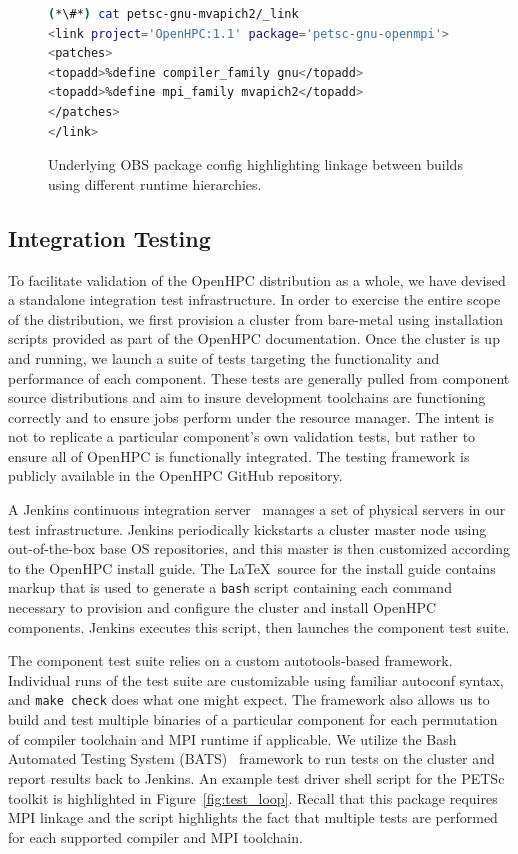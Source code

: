 \documentclass{sig-alternate-05-2015}
\begin{document}
\begin{figure}[h]
\begin{lstlisting}[language=bash,keywords={},basicstyle=\fontsize{7.8}{10}\ttfamily,keepspaces]
(*\#*) cat petsc-gnu-mvapich2/_link
<link project='OpenHPC:1.1' package='petsc-gnu-openmpi'>
<patches>
<topadd>%define compiler_family gnu</topadd>
<topadd>%define mpi_family mvapich2</topadd>
</patches>
</link>
\end{lstlisting}
\vspace*{-0.3cm}
\caption{Underlying OBS package config highlighting linkage between builds
  using different runtime hierarchies.}
\label{fig:obs_link}
\end{figure}

\subsection{Integration Testing} \label{sec:integ_testing}
To facilitate validation of the OpenHPC distribution as a whole, we have
devised a standalone integration test infrastructure. In order to exercise the
entire scope of the distribution, we first provision a cluster from bare-metal
using installation scripts provided as part of the OpenHPC documentation. Once
the cluster is up and running, we launch a suite of tests targeting the
functionality and performance of each component. These tests are generally
pulled from component source distributions and aim to insure development
toolchains are functioning correctly and to ensure jobs perform under the
resource manager. The intent is not to replicate a particular component's own
validation tests, but rather to ensure all of OpenHPC is functionally
integrated. The testing framework is publicly available in the OpenHPC GitHub
repository.

A Jenkins continuous integration server~\cite{jenkins_url} manages a set of 
physical servers in our test infrastructure. Jenkins periodically kickstarts a cluster 
master node using out-of-the-box base OS repositories, and this master is then 
customized according to the OpenHPC install guide. The \LaTeX\ source for the 
install guide contains markup that is used to generate a \texttt{{bash}} script 
containing each command necessary to provision and configure the cluster and install OpenHPC
components. Jenkins executes this script, then launches the component test suite.

The component test suite relies on a custom autotools-based framework.
Individual runs of the test suite are customizable using familiar autoconf
syntax, and \texttt{{make check}} does what one might expect. The framework
also allows us to build and test multiple binaries of a particular component
for each permutation of compiler toolchain and MPI runtime if applicable.  We
utilize the Bash Automated Testing System (BATS)~\cite{bats_url} framework to
run tests on the cluster and report results back to Jenkins. An example test
driver shell script for the PETSc toolkit is highlighted in Figure~\ref{fig:test_loop}. Recall that this package
requires MPI linkage and the script highlights the fact that multiple tests are
performed for each supported compiler and MPI toolchain.
\end{document}
